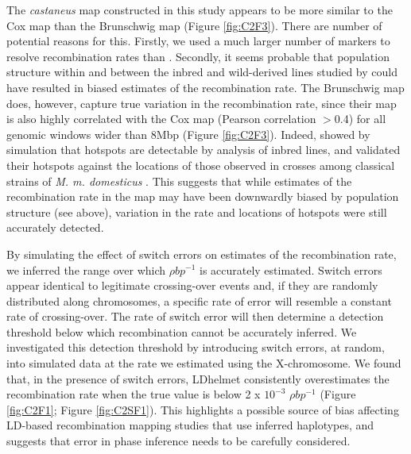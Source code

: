 The \textit{castaneus} map constructed in this study appears to be more similar to the Cox map than the Brunschwig map (Figure \ref{fig:C2F3}). There are number of potential reasons for this. Firstly, we used a much larger number of markers to resolve recombination rates than \cite{RN156}. Secondly, it seems probable that population structure within and between the inbred and wild-derived lines studied by \cite{RN156} could have resulted in biased estimates of the recombination rate. The Brunschwig map does, however, capture true variation in the recombination rate, since their map is also highly correlated with the Cox map (Pearson correlation $>$0.4) for all genomic windows wider than 8Mbp (Figure \ref{fig:C2F3}). Indeed, \cite{RN156} showed by simulation that hotspots are detectable by analysis of inbred lines, and validated their hotspots against the locations of those observed in crosses among classical strains of \textit{M. m. domesticus} \citep{RN180}. This suggests that while estimates of the recombination rate in the \cite{RN156} map may have been downwardly biased by population structure (see above), variation in the rate and locations of hotspots were still accurately detected.
 
By simulating the effect of switch errors on estimates of the recombination rate, we inferred the range over which $\rho bp^{-1}$ is accurately estimated. Switch errors appear identical to legitimate crossing-over events and, if they are randomly distributed along chromosomes, a specific rate of error will resemble a constant rate of crossing-over. The rate of switch error will then determine a detection threshold below which recombination cannot be accurately inferred. We investigated this detection threshold by introducing switch errors, at random, into simulated data at the rate we estimated using the X-chromosome. We found that, in the presence of switch errors, LDhelmet consistently overestimates the recombination rate when the true value is below 2 x $10^{-3}$ $\rho bp^{-1}$ (Figure \ref{fig:C2F1}; Figure \ref{fig:C2SF1}). This highlights a possible source of bias affecting LD-based recombination mapping studies that use inferred haplotypes, and suggests that error in phase inference needs to be carefully considered.

